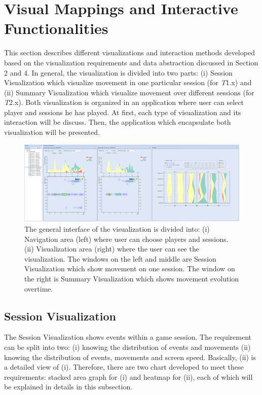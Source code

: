 \documentclass{vgtc}                          %
\begin{document}
\section{Visual Mappings and Interactive Functionalities}
This section describes different visualizations and interaction methods developed based on the visualization requirements and data abstraction discussed in Section 2 and 4. In general, the visualization is divided into two parts: (i) Session Visualization which visualize movement in one particular session (for \textit{T}1.x) and (ii) Summary Visualization which visualize movement over different sessions (for \textit{T}2.x). Both visualization is organized in an application where user can select player and sessions he has played. At first, each type of visualization and its interaction will be discuss. Then, the application which encapsulate both visualization will be presented.
\begin{figure}
	\centering
	\includegraphics[width=180mm]{images/interface_all3.png}
	\caption{The general interface of the visualization is divided into: (i) Navigation area (left) where user can choose players and sessions. (ii) Visualization area (right) where the user can see the visualization. The windows on the left and middle are Session Visualization which show movement on one session. The window on the right is Summary Visualization which shows movement evolution overtime.}
	\label{fig:interface_all}
\end{figure}

\subsection{Session Visualization}
The Session Visualization shows events within a game session. The requirement can be split into two: (i) knowing the distribution of events and movements (ii) knowing the distribution of events, movements and screen speed. Basically, (ii) is a detailed view of (i). Therefore, there are two chart developed to meet these requirements: stacked area graph for (i) and heatmap for (ii), each of which will be explained in details in this subsection.
\end{document}
